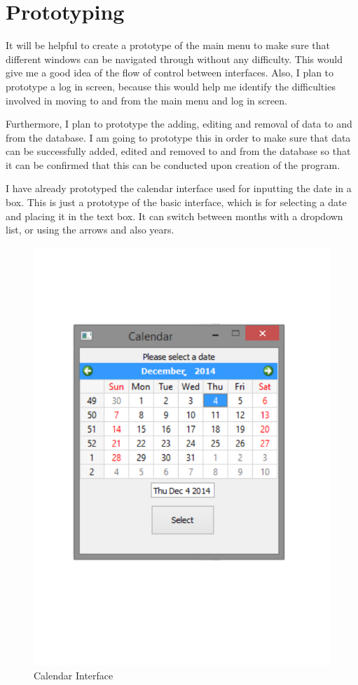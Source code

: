 \section{Prototyping}

It will be helpful to create a prototype of the main menu to make sure that different windows can be navigated through without any difficulty. This would give me a good idea of the flow of control between interfaces. Also, I plan to prototype a log in screen, because this would help me identify the difficulties involved in moving to and from the main menu and log in screen.

Furthermore, I plan to prototype the adding, editing and removal of data to and from the database. I am going to prototype this in order to make sure that data can be successfully added, edited and removed to and from the database so that it can be confirmed that this can be conducted upon creation of the program.

I have already prototyped the calendar interface used for inputting the date in a box. This is just a prototype of the basic interface, which is for selecting a date and placing it in the text box. It can switch between months with a dropdown list, or using the arrows and also years.

\begin{figure}[H]
    \caption{Calendar Interface} \label{Calendar_1.pdf}
    \includegraphics[width=\textwidth]{./Design/Calendar_1.pdf}
\end{figure}

